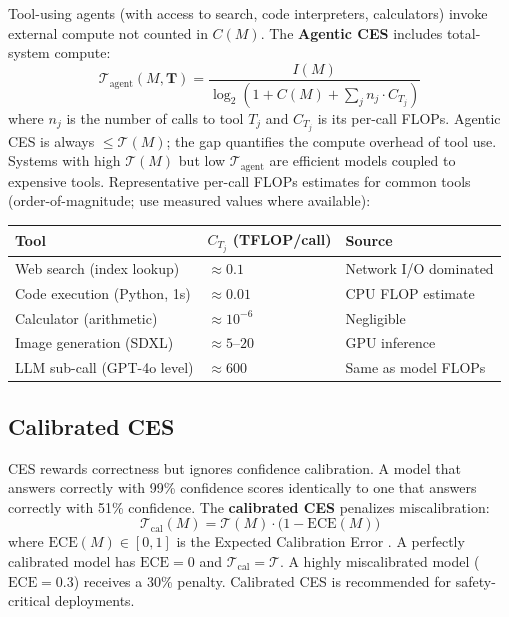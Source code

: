\documentclass[12pt]{article}
\begin{document}
Tool-using agents (with access to search, code interpreters, calculators) invoke external compute not counted in $C(M)$. The \textbf{Agentic CES} includes total-system compute:
\begin{equation}
\mathcal{T}_{\text{agent}}(M, \mathbf{T}) = \frac{I(M)}{\log_2\!\left(1 + C(M) + \sum_{j} n_j \cdot C_{T_j}\right)}
\end{equation}
where $n_j$ is the number of calls to tool $T_j$ and $C_{T_j}$ is its per-call FLOPs. Agentic CES is always $\leq \mathcal{T}(M)$; the gap quantifies the compute overhead of tool use. Systems with high $\mathcal{T}(M)$ but low $\mathcal{T}_{\text{agent}}$ are efficient models coupled to expensive tools. Representative per-call FLOPs estimates for common tools (order-of-magnitude; use measured values where available):
\begin{center}\small
\begin{tabular}{lll}
\toprule
\textbf{Tool} & $C_{T_j}$ \textbf{(TFLOP/call)} & \textbf{Source} \\
\midrule
Web search (index lookup) & $\approx 0.1$ & Network I/O dominated \\
Code execution (Python, 1s) & $\approx 0.01$ & CPU FLOP estimate \\
Calculator (arithmetic)     & $\approx 10^{-6}$ & Negligible \\
Image generation (SDXL)     & $\approx 5$--$20$ & GPU inference \\
LLM sub-call (GPT-4o level) & $\approx 600$ & Same as model FLOPs \\
\bottomrule
\end{tabular}
\end{center}

\subsection{Calibrated CES}
\label{sec:calibrated-ces}

CES rewards correctness but ignores confidence calibration. A model that answers correctly with 99\% confidence scores identically to one that answers correctly with 51\% confidence. The \textbf{calibrated CES} penalizes miscalibration:
\begin{equation}
\mathcal{T}_{\text{cal}}(M) = \mathcal{T}(M) \cdot \bigl(1 - \mathrm{ECE}(M)\bigr)
\end{equation}
where $\mathrm{ECE}(M) \in [0,1]$ is the Expected Calibration Error \cite{guo2017}. A perfectly calibrated model has $\mathrm{ECE} = 0$ and $\mathcal{T}_{\text{cal}} = \mathcal{T}$. A highly miscalibrated model ($\mathrm{ECE} = 0.3$) receives a 30\% penalty. Calibrated CES is recommended for safety-critical deployments.
\end{document}
